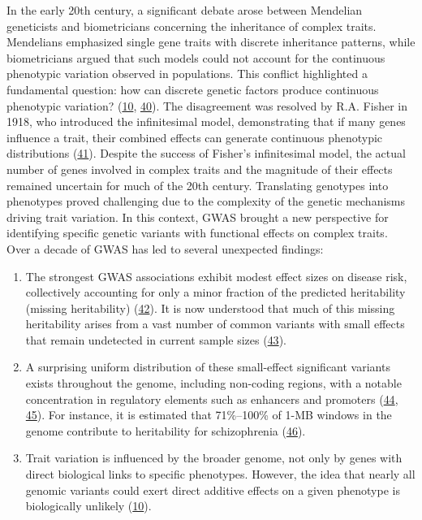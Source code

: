 In the early 20th century, a significant debate arose between Mendelian geneticists and biometricians concerning the inheritance of complex traits.
Mendelians emphasized single gene traits with discrete inheritance patterns, while biometricians argued that such models could not account for the continuous phenotypic variation observed in populations.
This conflict highlighted a fundamental question: how can discrete genetic factors produce continuous phenotypic variation? (\protect\hyperlink{ref-vpIDZCSa}{10}, \protect\hyperlink{ref-15ldVppuv}{40}).
The disagreement was resolved by R.A. Fisher in 1918, who introduced the infinitesimal model, demonstrating that if many genes influence a trait, their combined effects can generate continuous phenotypic distributions (\protect\hyperlink{ref-Qxk70FFV}{41}).
Despite the success of Fisher's infinitesimal model, the actual number of genes involved in complex traits and the magnitude of their effects remained uncertain for much of the 20th century.
Translating genotypes into phenotypes proved challenging due to the complexity of the genetic mechanisms driving trait variation.
In this context, GWAS brought a new perspective for identifying specific genetic variants with functional effects on complex traits.
Over a decade of GWAS has led to several unexpected findings:

\begin{enumerate}
\def\labelenumi{\arabic{enumi}.}
\item
  The strongest GWAS associations exhibit modest effect sizes on disease risk, collectively accounting for only a minor fraction of the predicted heritability (missing heritability) (\protect\hyperlink{ref-RASeYPIy}{42}).
  It is now understood that much of this missing heritability arises from a vast number of common variants with small effects that remain undetected in current sample sizes (\protect\hyperlink{ref-1AOy1zxAv}{43}).
\item
  A surprising uniform distribution of these small-effect significant variants exists throughout the genome, including non-coding regions, with a notable concentration in regulatory elements such as enhancers and promoters (\protect\hyperlink{ref-mwTa2RUK}{44}, \protect\hyperlink{ref-lVJVFaaZ}{45}).
  For instance, it is estimated that 71\%--100\% of 1-MB windows in the genome contribute to heritability for schizophrenia (\protect\hyperlink{ref-XvQe1H3A}{46}).
\item
  Trait variation is influenced by the broader genome, not only by genes with direct biological links to specific phenotypes.
  However, the idea that nearly all genomic variants could exert direct additive effects on a given phenotype is biologically unlikely (\protect\hyperlink{ref-vpIDZCSa}{10}).
\end{enumerate}

